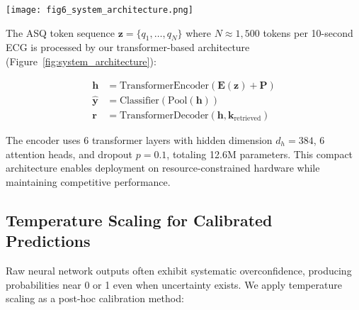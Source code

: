 \documentclass[journal]{IEEEtran}
\begin{document}
\begin{figure*}[!t]
\centering
\texttt{[image: fig6\_system\_architecture.png]}
\caption{\textbf{ECG-ASQ-LLM system architecture showing the integrated pipeline from raw ECG to calibrated diagnosis with grounded report generation.} The system processes 12-lead ECG signals through four main stages: (1) Dual-path feature extraction combining ASQ tokenization (achieving 54.6:1 compression) and traditional clinical features (QRS/QT/ST intervals); (2) Transformer encoding with 6 layers processing ASQ tokens and clinical features jointly; (3) Knowledge-augmented decoding where retrieved medical knowledge from guidelines is fused with encoder outputs via cross-attention; (4) Calibrated prediction through temperature scaling ($T^*=1.82$) producing well-calibrated probability estimates. The architecture demonstrates tight integration of physiologically-informed tokenization, transformer reasoning, medical knowledge, and probabilistic calibration.}
\label{fig:system_architecture}
\end{figure*}

The ASQ token sequence $\mathbf{z} = \{q_1, \ldots, q_N\}$ where $N \approx 1{,}500$ tokens per 10-second ECG is processed by our transformer-based architecture (Figure~\ref{fig:system_architecture}):

\begin{align}
\mathbf{h} &= \text{TransformerEncoder}(\mathbf{E}(\mathbf{z}) + \mathbf{P}) \\
\hat{\mathbf{y}} &= \text{Classifier}(\text{Pool}(\mathbf{h})) \\
\mathbf{r} &= \text{TransformerDecoder}(\mathbf{h}, \mathbf{k}_{\text{retrieved}})
\end{align}

The encoder uses 6 transformer layers with hidden dimension $d_h=384$, 6 attention heads, and dropout $p=0.1$, totaling 12.6M parameters. This compact architecture enables deployment on resource-constrained hardware while maintaining competitive performance.

\subsection{Temperature Scaling for Calibrated Predictions}

Raw neural network outputs often exhibit systematic overconfidence, producing probabilities near 0 or 1 even when uncertainty exists. We apply temperature scaling as a post-hoc calibration method:
\end{document}
